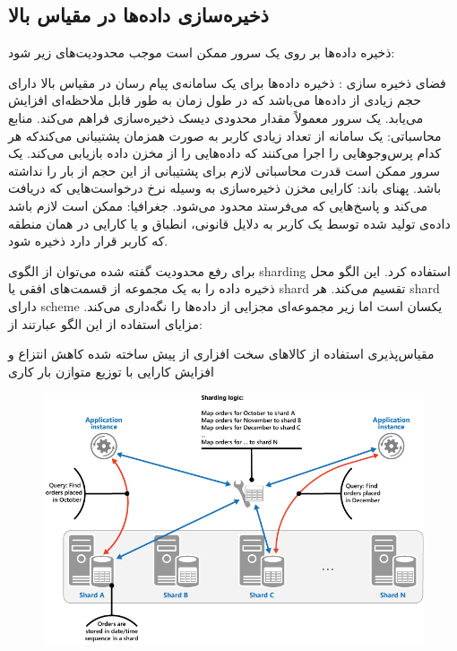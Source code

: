  
 \subsection{ذخیره‌سازی داده‌ها در مقیاس بالا}
 ذخیره داده‌ها بر روی یک سرور ممکن است موجب محدودیت‌های زیر شود:
 \begin{itemize}
 فضای ذخیره سازی : ذخیره داده‌ها برای یک سامانه‌ی پیام رسان در مقیاس بالا دارای حجم زیادی از داده‌ها می‌باشد که در طول زمان به طور قابل ملاحظه‌ای افزایش می‌یابد. یک سرور معمولاً مقدار محدودی دیسک ذخیره‌سازی فراهم می‌کند.
 منابع محاسباتی: یک سامانه از تعداد زیادی کاربر به صورت همزمان پشتیبانی می‌کندکه هر کدام پرس‌و‌جو‌هایی را اجرا می‌کنند که داده‌هایی را از مخزن داده بازیابی می‌کند. یک سرور ممکن است قدرت محاسباتی لازم برای پشتیبانی از این حجم از بار را نداشته باشد.
 پهنای باند: کارایی مخزن ذخیره‌سازی به وسیله نرخ درخواست‌هایی که دریافت می‌کند و پاسخ‌هایی که می‌فرستد محدود می‌شود.
 جغرافیا: ممکن است لازم باشد داده‌ی تولید شده توسط یک کاربر به دلایل قانونی، انطباق و یا کارایی  در همان منطقه که کاربر قرار دارد ذخیره شود.

 \end{itemize}
 
 برای رفع محدودیت گفته شده می‌توان از الگوی sharding استفاده کرد. این الگو محل ذخیره داده را به یک مجموعه از قسمت‌های افقی یا shard تقسیم می‌کند. هر shard دارای scheme یکسان است اما زیر مجموعه‌ای مجزایی از داده‌ها را نگه‌داری می‌کند. مزایای استفاده از این الگو عبارتند از: 
 \begin{itemize}
  مقیاس‌پذیری
 استفاده از کالاهای سخت افزاری از پیش ساخته شده 
 کاهش انتزاع و افزایش کارایی با توزیع متوازن بار کاری
 \end{itemize}
 
 
  \begin{figure}[H]
  \centering
  \includegraphics[scale=.4]{img/sharding.png}
  \end{figure}
  
